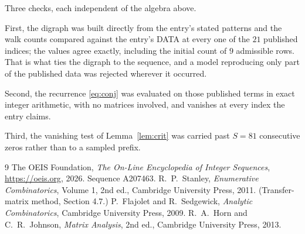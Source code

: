 \documentclass[11pt,a4paper]{article}
\theoremstyle{plain}
\theoremstyle{definition}
\begin{document}
Three checks, each independent of the algebra above.

First, the digraph was built directly from the entry's stated patterns and the walk counts
compared against the entry's DATA at every one of the $21$ published indices; the
values agree exactly, including the initial count of $9$ admissible rows. That is
what ties the digraph to the sequence, and a model reproducing only part of the published
data was rejected wherever it occurred.

Second, the recurrence \eqref{eq:conj} was evaluated on those published terms in exact
integer arithmetic, with no matrices involved, and vanishes at every index the entry claims.

Third, the vanishing test of Lemma~\ref{lem:crit} was carried past $S=81$ consecutive
zeros rather than to a sampled prefix.

\begin{thebibliography}{9}
 The OEIS Foundation, \emph{The On-Line Encyclopedia of Integer
Sequences}, \url{https://oeis.org}, 2026. Sequence A207463.
 R.~P.~Stanley, \emph{Enumerative Combinatorics}, Volume 1, 2nd ed.,
Cambridge University Press, 2011. (Transfer-matrix method, Section 4.7.)
 P.~Flajolet and R.~Sedgewick, \emph{Analytic Combinatorics}, Cambridge
University Press, 2009.
 R.~A.~Horn and C.~R.~Johnson, \emph{Matrix Analysis}, 2nd ed., Cambridge
University Press, 2013.
\end{thebibliography}
\end{document}
